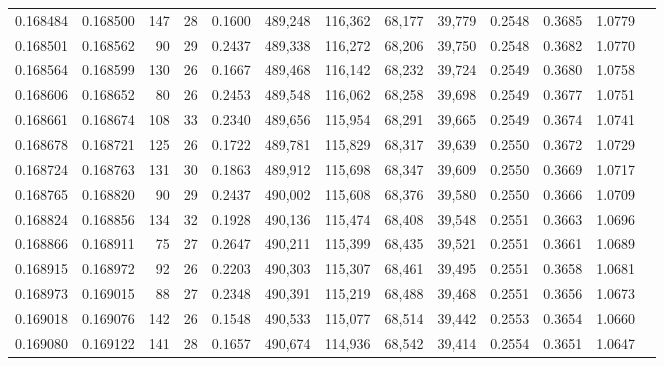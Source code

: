 \begin{tabular}{rrrrrrrrrrrrr}
0.168484 & 0.168500 &   147 &  28 &                                     0.1600 & 489,248 & 116,362 &  68,177 &  39,779 & 0.2548 & 0.3685 & 1.0779 \\
0.168501 & 0.168562 &    90 &  29 &                                     0.2437 & 489,338 & 116,272 &  68,206 &  39,750 & 0.2548 & 0.3682 & 1.0770 \\
0.168564 & 0.168599 &   130 &  26 &                                     0.1667 & 489,468 & 116,142 &  68,232 &  39,724 & 0.2549 & 0.3680 & 1.0758 \\
0.168606 & 0.168652 &    80 &  26 &                                     0.2453 & 489,548 & 116,062 &  68,258 &  39,698 & 0.2549 & 0.3677 & 1.0751 \\
0.168661 & 0.168674 &   108 &  33 &                                     0.2340 & 489,656 & 115,954 &  68,291 &  39,665 & 0.2549 & 0.3674 & 1.0741 \\
0.168678 & 0.168721 &   125 &  26 &                                     0.1722 & 489,781 & 115,829 &  68,317 &  39,639 & 0.2550 & 0.3672 & 1.0729 \\
0.168724 & 0.168763 &   131 &  30 &                                     0.1863 & 489,912 & 115,698 &  68,347 &  39,609 & 0.2550 & 0.3669 & 1.0717 \\
0.168765 & 0.168820 &    90 &  29 &                                     0.2437 & 490,002 & 115,608 &  68,376 &  39,580 & 0.2550 & 0.3666 & 1.0709 \\
0.168824 & 0.168856 &   134 &  32 &                                     0.1928 & 490,136 & 115,474 &  68,408 &  39,548 & 0.2551 & 0.3663 & 1.0696 \\
0.168866 & 0.168911 &    75 &  27 &                                     0.2647 & 490,211 & 115,399 &  68,435 &  39,521 & 0.2551 & 0.3661 & 1.0689 \\
0.168915 & 0.168972 &    92 &  26 &                                     0.2203 & 490,303 & 115,307 &  68,461 &  39,495 & 0.2551 & 0.3658 & 1.0681 \\
0.168973 & 0.169015 &    88 &  27 &                                     0.2348 & 490,391 & 115,219 &  68,488 &  39,468 & 0.2551 & 0.3656 & 1.0673 \\
0.169018 & 0.169076 &   142 &  26 &                                     0.1548 & 490,533 & 115,077 &  68,514 &  39,442 & 0.2553 & 0.3654 & 1.0660 \\
0.169080 & 0.169122 &   141 &  28 &                                     0.1657 & 490,674 & 114,936 &  68,542 &  39,414 & 0.2554 & 0.3651 & 1.0647 \\

\end{tabular}
